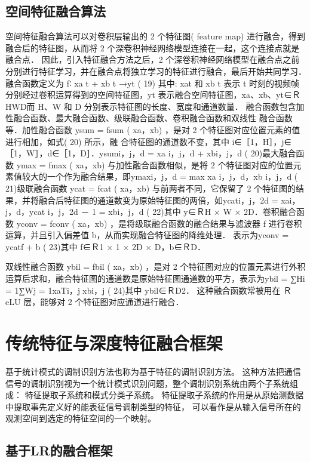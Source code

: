 \subsection{空间特征融合算法}
空间特征融合算法可以对卷积层输出的 2 个特征图( feature map) 进行融合，得到融合后的特征图，从而将 2 个深卷积神经网络模型连接在一起，这个连接点就是融合点． 因此，引入特征融合方法之后，2 个深卷积神经网络模型在融合点之前分别进行特征学习，并在融合点将独立学习的特征进行融合，最后开始共同学习． 融合函数定义为
f∶ xa
t + xb
t →yt ( 19)
其中: xat 和 xb
t 表示 t 时刻的视频帧分别经过卷积运算得到的空间特征图，yt 表示融合空间特征图，xa、xb、yt∈ＲHWD而 H、W 和 D 分别表示特征图的长度、宽度和通道数量． 融合函数包含加性融合函数、最大融合函数、级联融合函数、卷积融合函数和双线性
融合函数等．加性融合函数 ysum = fsum ( xa，xb) ，是对 2 个特征图对应位置元素的值进行相加，如式( 20) 所示，融
合特征图的通道数不变，其中 i∈［1，H］，j∈［1，W］，d∈［1，D］．ysumi，j，d = xa
i，j，d + xbi，j，d ( 20)最大融合函数 ymax = fmax ( xa，xb) 与加性融合函数相似，是将 2 个特征图对应的位置元素值较大的一个作为融合结果，即ymaxi，j，d = max{ xa	i，j，d，xb	i，j，d } ( 21)级联融合函数 ycat = fcat ( xa，xb) 与前两者不同，它保留了 2 个特征图的结果，并将融合后特征图的通道数变为原始特征图的两倍，如ycati，j，2d = xai，j，d，ycat
i，j，2d － 1 = xbi，j，d ( 22)其中 y∈ＲH × W × 2D．卷积融合函数 yconv = fconv ( xa，xb) ，是将级联融合函数的融合结果与滤波器 f 进行卷积运算，并且引入偏差值 b，从而实现融合特征图的降维处理． 表示为yconv = ycatf + b ( 23)其中 f∈Ｒ1 × 1 × 2D × D，b∈ＲD．

双线性融合函数 ybil = fbil ( xa，xb) ，是对 2 个特征图对应的位置元素进行外积运算后求和，融合特征图的通道数是原始特征图通道数的平方，表示为ybil = ∑Hi = 1∑Wj = 1xaTi，jxbi，j ( 24)其中 ybil∈ＲD2． 这种融合函数常被用在 ＲeLU 层，能够对 2 个特征图对应通道进行融合．


\section{传统特征与深度特征融合框架}

基于统计模式的调制识别方法也称为基于特征的调制识别方法。
这种方法把通信信号的调制识别视为一个统计模式识别问题，整个调制识别系统由两个子系统组成：
特征提取子系统和模式分类子系统。
特征提取子系统的作用是从原始测数据中提取事先定义好的能表征信号调制类型的特征，
可以看作是从输入信号所在的观测空间到选定的特征空间的一个映射。\par

\subsection{基于LR的融合框架}

